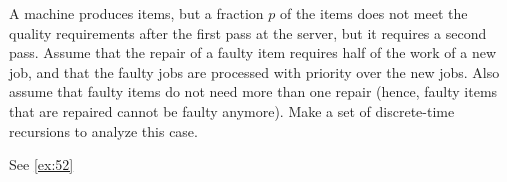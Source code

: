 
\begin{extra}[201904, 2]
  A machine produces items, but a fraction $p$ of the items does not meet the quality requirements after the first pass at the server, but it requires a second pass.
  Assume that the repair of a faulty item requires half of the work of a new job, and that the faulty jobs are processed with priority over the new jobs.
  Also assume that faulty items do not need more than one repair (hence, faulty items that are repaired cannot be faulty anymore).
  Make a set of discrete-time recursions to analyze this case.
  \begin{solution}
See \ref{ex:52}
  \end{solution}
\end{extra}






